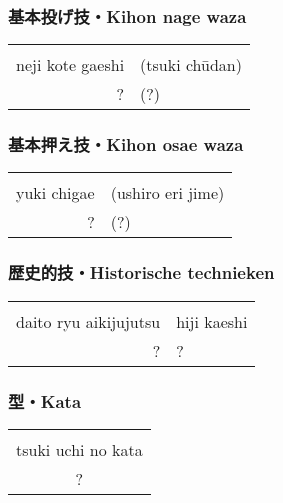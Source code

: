 \subsubsection{基本投げ技・Kihon nage waza}
\begin{table}[H]
\begin{center}
\begin{tabular}{rl}
    \ruby{}{}\ruby{}{} & \\
    neji kote gaeshi & (tsuki ch\={u}dan)\\
    ? & (?)
\end{tabular}
\end{center}
\label{kyuu_3_kihon_nage_waza}
\end{table}

\subsubsection{基本押え技・Kihon osae waza}
\begin{table}[H]
\begin{center}
\begin{tabular}{rl}
    \ruby{}{}\ruby{}{} & \\
    yuki chigae & (ushiro eri jime)\\
    ? & (?)
\end{tabular}
\end{center}
\label{kyuu_3_kihon_osae_waza}
\end{table}

\subsubsection{歴史的技・Historische technieken}
\begin{table}[H]
\begin{center}
\begin{tabular}{rl}
    \ruby{}{}\ruby{}{} & \\
    daito ryu aikijujutsu & hiji kaeshi\\
    ? & ?
\end{tabular}
\end{center}
\label{kyuu_3_historic}
\end{table}

\subsubsection{型・Kata}
\begin{table}[H]
\begin{center}
\begin{tabular}{c}
    \ruby{}{}\ruby{}{}\\
    tsuki uchi no kata\\
    ?
\end{tabular}
\end{center}
\label{kyuu_3_kata}
\end{table}

